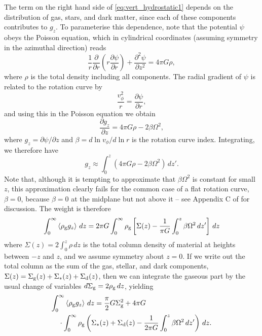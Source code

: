 \documentclass[useAMS,usenatbib]{mn2e}
\begin{document}
The term on the right hand side of \autoref{eq:vert_hydrostatic1} depends on the distribution of gas, stars, and dark matter, since each of these components contributes to $g_z$. To parameterise this dependence, note that the potential $\psi$ obeys the Poisson equation, which in cylindrical coordinates (assuming symmetry in the azimuthal direction) reads
\begin{equation}
\frac{1}{r}\frac{\partial}{\partial r}\left(r \frac{\partial \psi}{\partial r}\right) + \frac{\partial^2 \psi}{\partial z^2} = 4 \pi G \rho,
\end{equation}
where $\rho$ is the total density including all components. The radial gradient of $\psi$ is related to the rotation curve by 
\begin{equation}
\frac{v_\phi^2}{r} = \frac{\partial \psi}{\partial r},
\end{equation}
and using this in the Poisson equation we obtain
\begin{equation}
\frac{\partial g_z}{\partial z} = 4 \pi G \rho - 2 \beta \Omega^2,
\end{equation}
where $g_z = \partial \psi/\partial z$ and $\beta = d\ln v_\phi/ d\ln r$ is the rotation curve index. Integrating, we therefore have
\begin{equation}
g_z \approx \int_0^z \left(4 \pi G \rho - 2\beta \Omega^2\right) \,dz'.
\end{equation}
Note that, although it is tempting to approximate that $\beta\Omega^2$ is constant for small $z$, this approximation clearly fails for the common case of a flat rotation curve, $\beta = 0$, because $\beta = 0$ at the midplane but not above it -- see Appendix C of \citet{mckee15a} for discussion. The weight is therefore
\begin{equation}
\label{eq:wgt_integral}
\int_0^\infty \left\langle \rho_{\rm g} g_z\right\rangle \, dz = 
2\pi G \int_0^\infty \rho_{\rm g} \left[\Sigma(z) - \frac{1}{\pi G}\int_0^z \beta \Omega^2 \, dz' \right] \, dz
\end{equation}
where $\Sigma(z) = 2\int_0^z \rho \, dz$ is the total column density of material at heights between $-z$ and $z$, and we assume symmetry about $z=0$. If we write out the total column as the sum of the gas, stellar, and dark components, $\Sigma(z) = \Sigma_{\rm g}(z) + \Sigma_*(z) + \Sigma_{\rm d}(z)$, then we can integrate the gaseous part by the usual change of variables $d\Sigma_{\rm g} = 2 \rho_{\rm g} \, dz$, yielding
\begin{eqnarray}
\lefteqn{\int_0^\infty \left\langle \rho_{\rm g} g_z\right\rangle \, dz = \frac{\pi}{2} G \Sigma_{\rm g}^2 + 4\pi G}
\nonumber \\
& & {} \cdot
 \int_0^\infty \rho_{\rm g} \left(\Sigma_*(z) + \Sigma_{\rm d}(z) - \frac{1}{2\pi G} \int_0^z \beta\Omega^2\, dz'\right) \, dz.
\label{eq:wgt_integral2}
\end{eqnarray}
\end{document}
